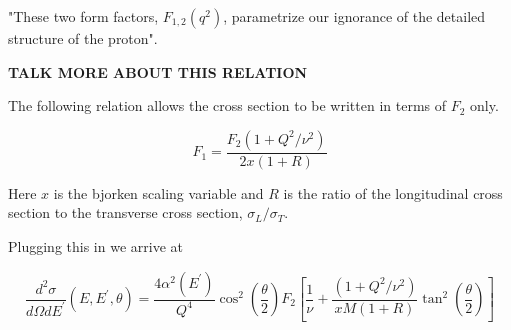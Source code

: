 "These two form factors, $F_{1,2}(q^2)$, parametrize our ignorance of the detailed structure of the proton". \cite{HaM}

\textbf{TALK MORE ABOUT THIS RELATION}

The following relation allows the cross section to be written in terms of $F_2$ only.

\begin{equation}
	F_1 = \frac{F_2\left(1+Q^2/\nu^2\right)}{2x\left(1+R\right)}
\end{equation}

Here $x$ is the bjorken scaling variable and $R$ is the ratio of the longitudinal cross section to the transverse cross section, $\sigma_L/\sigma_T$.

Plugging this in we arrive at

\begin{equation}
	\frac{d^2\sigma}{d\Omega dE^\prime}\left(E,E^\prime,\theta\right) = \frac{4\alpha^2\left(E^\prime\right)}{Q^4}\cos^2\left(\frac{\theta}{2}\right)F_2\left[\frac{1}{\nu}+\frac{\left(1+Q^2/\nu^2\right)}{xM\left(1+R\right)}\tan^2\left(\frac{\theta}{2}\right)\right]
\end{equation}